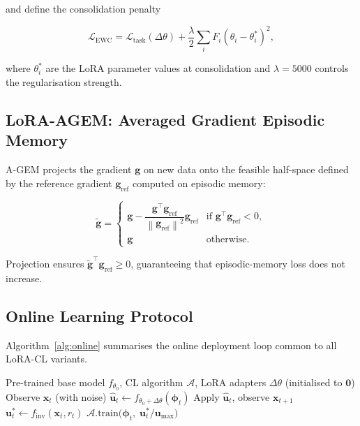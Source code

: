 \documentclass[journal]{IEEEtran}
\newcommand{\norm}[1]{\left\lVert #1 \right\rVert}
\newcommand{\bx}{\bm{x}}
\newcommand{\bu}{\bm{u}}
\begin{document}
and define the consolidation penalty

\begin{equation}
  \mathcal{L}_\text{EWC} = \mathcal{L}_\text{task}(\Delta\theta)
  + \frac{\lambda}{2}\sum_i F_i (\theta_i - \theta_i^*)^2,
\end{equation}

where $\theta_i^*$ are the LoRA parameter values at consolidation and
$\lambda = 5000$ controls the regularisation strength.

\subsection{LoRA-AGEM: Averaged Gradient Episodic Memory}

A-GEM \cite{chaudhry2019efficient} projects the gradient $\bm{g}$ on new
data onto the feasible half-space defined by the reference gradient
$\bm{g}_\text{ref}$ computed on episodic memory:

\begin{equation}
  \tilde{\bm{g}} =
  \begin{cases}
    \bm{g} - \dfrac{\bm{g}^\top \bm{g}_\text{ref}}
                   {\norm{\bm{g}_\text{ref}}^2}\bm{g}_\text{ref} &
    \text{if } \bm{g}^\top \bm{g}_\text{ref} < 0, \\
    \bm{g} & \text{otherwise.}
  \end{cases}
  \label{eq:agem}
\end{equation}

Projection ensures $\tilde{\bm{g}}^\top \bm{g}_\text{ref} \geq 0$,
guaranteeing that episodic-memory loss does not increase.

\subsection{Online Learning Protocol}

Algorithm~\ref{alg:online} summarises the online deployment loop common
to all LoRA-CL variants.

\begin{algorithm}
\caption{Online LoRA-CL Deployment}
\label{alg:online}
\begin{algorithmic}[1]
\Require Pre-trained base model $f_{\theta_0}$, CL algorithm $\mathcal{A}$,
         LoRA adapters $\Delta\theta$ (initialised to $\bm{0}$)
  \State Observe $\bx_t$ (with noise)
  \State $\hat{\bu}_t \leftarrow f_{\theta_0 + \Delta\theta}(\bm{\phi}_t)$
  \State Apply $\hat{\bu}_t$, observe $\bx_{t+1}$
  \State $\bu^*_t \leftarrow f_\text{inv}(\bx_t, r_t)$
  \State $\mathcal{A}.\text{train}\bigl(\bm{\phi}_t,\; \bu^*_t / \bu_\text{max}\bigr)$
\EndFor
\end{algorithmic}
\end{algorithm}
\end{document}
